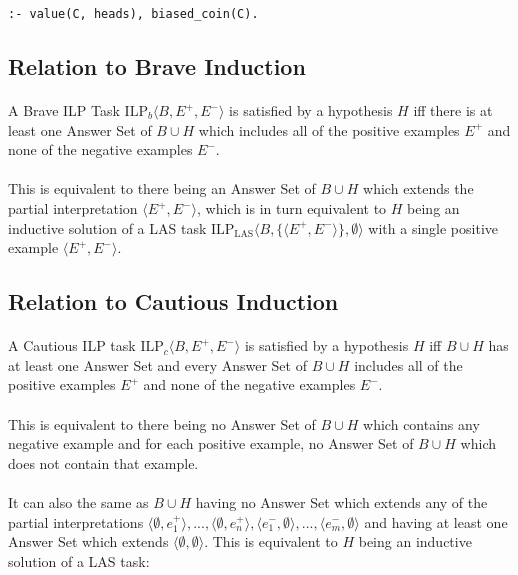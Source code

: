 \documentclass{article}
\theoremstyle{plain}
\theoremstyle{definition}
\begin{document}
\begin{multicols}{2}
\begin{lstlisting}
:- value(C, heads), biased_coin(C).
\end{lstlisting}

\subsection{Relation to Brave Induction}

\paragraph{} A Brave ILP Task $\text{ILP}_b\langle B, E^+, E^-\rangle$ is satisfied by a hypothesis $H$ iff there is at least one Answer Set of $B \cup H$ which includes all of the positive examples $E^+$ and none of the negative examples $E^-$.

\paragraph{} This is equivalent to there being an Answer Set of $B \cup H$ which extends the partial interpretation $\langle E^+, E^-\rangle$, which is in turn equivalent to $H$ being an inductive solution of a LAS task $\text{ILP}_\text{LAS} \langle B, \{\langle E^+, E^- \rangle\}, \emptyset\rangle$ with a single positive example $\langle E^+, E^-\rangle$.

\subsection{Relation to Cautious Induction}

\paragraph{} A Cautious ILP task $\text{ILP}_c\langle B, E^+, E^-\rangle$ is satisfied by a hypothesis $H$ iff $B \cup H$ has at least one Answer Set and every Answer Set of $B \cup H$ includes all of the positive examples $E^+$ and none of the negative examples $E^-$.

\paragraph{} This is equivalent to there being no Answer Set of $B \cup H$ which contains any negative example and for each positive example, no Answer Set of $B \cup H$ which does not contain that example.

\paragraph{} It can also the same as $B \cup H$ having no Answer Set which extends any of the partial interpretations $\langle \emptyset, e^+_1\rangle, ..., \langle \emptyset, e^+_n\rangle, \langle e^-_1, \emptyset\rangle, ..., \langle e^-_m, \emptyset\rangle$ and having at least one Answer Set which extends $\langle \emptyset, \emptyset \rangle$. This is equivalent to $H$ being an inductive solution of a LAS task:


\end{multicols}
\end{document}
